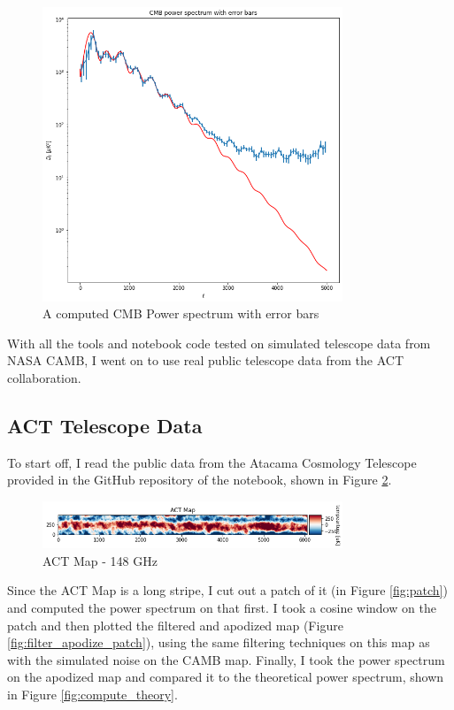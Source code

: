 \documentclass[12pt]{article}
\begin{document}
\begin{figure}[H]
    \centering
    \includegraphics[width=0.8\textwidth]{images/cmb error bars.png}
    \caption{A computed CMB Power spectrum with error bars}
    \label{fig:computed_cmb}
\end{figure}

With all the tools and notebook code tested on simulated telescope data from NASA CAMB, I went on to use real public telescope data from the ACT collaboration.

\subsection{ACT Telescope Data}
To start off, I read the public data from the Atacama Cosmology Telescope provided in the GitHub repository of the notebook, shown in Figure \ref{fig:reading}.

\begin{figure}[H]
    \centering
    \includegraphics[width=0.8\textwidth]{images/ACT Map.png}
    \caption{ACT Map - 148 GHz}
    \label{fig:reading}
\end{figure}

Since the ACT Map is a long stripe, I cut out a patch of it (in Figure \ref{fig:patch}) and computed the power spectrum on that first. I took a cosine window on the patch and then plotted the filtered and apodized map (Figure \ref{fig:filter_apodize_patch}), using the same filtering techniques on this map as with the simulated noise on the CAMB map. Finally, I took the power spectrum on the apodized map and compared it to the theoretical power spectrum, shown in Figure \ref{fig:compute_theory}.
\end{document}
